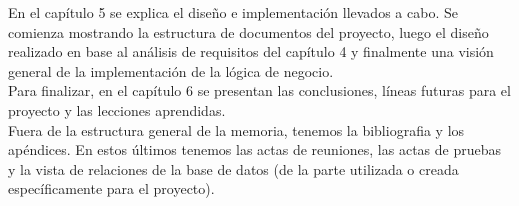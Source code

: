 En el capítulo 5 se explica el diseño e implementación llevados a cabo. Se comienza mostrando la estructura de documentos del proyecto, luego el diseño realizado en base al análisis de requisitos del capítulo 4 y finalmente una visión general de la implementación de la lógica de negocio.\\

Para finalizar, en el capítulo 6 se presentan las conclusiones, líneas futuras para el proyecto y las lecciones aprendidas.\\

Fuera de la estructura general de la memoria, tenemos la bibliografia y los apéndices. En estos últimos tenemos las actas de reuniones, las actas de pruebas y la vista de relaciones de la base de datos (de la parte utilizada o creada específicamente para el proyecto).\\